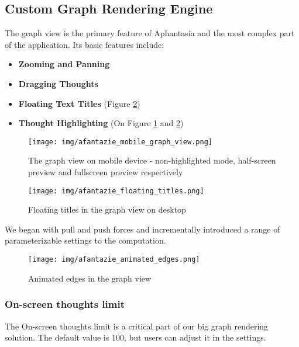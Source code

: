 \subsection{Custom Graph Rendering Engine}

The graph view is the primary feature of Aphantasia and the most complex part of the application.
Its basic features include:
\begin{itemize}
\item \textbf{Zooming and Panning}
\item \textbf{Dragging Thoughts}
\item \textbf{Floating Text Titles} (Figure \ref{obr:afantazie_floating_titles})
\item \textbf{Thought Highlighting} (On Figure \ref{obr:afantazie_mobile_graph_view} and \ref{obr:afantazie_floating_titles})
\end{itemize}

\begin{figure}[p]
    \texttt{[image: img/afantazie\_mobile\_graph\_view.png]}
    \caption{The graph view on mobile device - non-highlighted mode, half-screen preview and fullscreen preview respectively}
    \label{obr:afantazie_mobile_graph_view}
\end{figure}


\begin{figure}[p]
    \texttt{[image: img/afantazie\_floating\_titles.png]}
    \caption{Floating titles in the graph view on desktop}
    \label{obr:afantazie_floating_titles}
\end{figure}


We began with pull and push forces and incrementally introduced a range of parameterizable settings to the computation.



\begin{figure}[p]
    \texttt{[image: img/afantazie\_animated\_edges.png]}
    \caption{Animated edges in the graph view}
    \label{obr:afantazie_animated_edges}
\end{figure}

\subsubsection*{On-screen thoughts limit}
The On-screen thoughts limit is a critical part of our big graph rendering solution.
The default value is 100, but users can adjust it in the settings.

